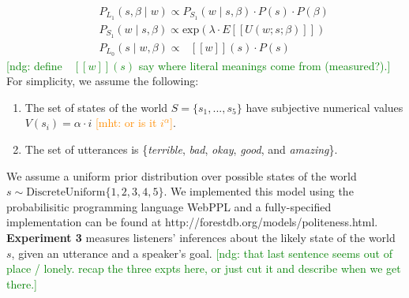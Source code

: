 \documentclass[10pt,letterpaper]{article}
\newcommand{\denote}[1]{\mbox{ $[\![ #1 ]\!]$}}
\newcommand{\ndg}[1]{\textcolor{Green}{[ndg: #1]}}
\newcommand{\mht}[1]{\textcolor{DarkOrange}{[mht: #1]}}
\newcommand{\ejy}[1]{\textcolor{Blue}{[ejy: #1]}}
\begin{document}
%
\begin{eqnarray}
&&P_{L_1}(s, \beta \mid w)\propto P_{S_1}(w \mid s, \beta)\cdot P(s) \cdot P(\beta) \label{eq:L1}\\
&&P_{S_1}(w \mid s, \beta) \propto \mathrm{exp}(\lambda \cdot E[[U(w; s; \beta)]])\label{eq:S1}\\
&&P_{L_0}(s \mid w, \beta)\propto \denote{w}(s) \cdot P(s) \label{eq:L0}
\end{eqnarray}
%
\ndg{define $ \denote{w}(s)$ say where literal meanings come from (measured?).}
For simplicity, we assume the following:
\begin{enumerate}
\item The set of states of the world $S = \{s_{1}, ...,  s_{5}\}$ have subjective numerical values $V(s_{i}) = \alpha \cdot i$ \mht{or is it $i^\alpha$}. 
\item The set of utterances is \{\emph{terrible}, \emph{bad}, \emph{okay}, \emph{good}, and \emph{amazing}\}.
\end{enumerate}

We assume a uniform prior distribution over possible states of the world $s\sim \text{DiscreteUniform} \{1, 2, 3, 4, 5\}$. 
We implemented this model using the probabilisitic programming language WebPPL \cite{dippl} and a fully-specified implementation can be found at http://forestdb.org/models/politeness.html.
\textbf{Experiment 3} measures listeners' inferences about the likely state of the world $s$, given an utterance and a speaker's goal. 
\ndg{that last sentence seems out of place / lonely. recap the three expts here, or just cut it and describe when we get there.}

%
\end{document}
